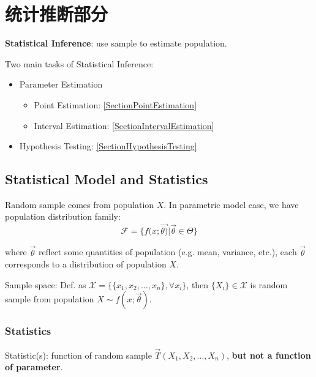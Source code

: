 \section{统计推断部分}

    \textbf{Statistical Inference}: use sample to estimate population.
    
    Two main tasks of Statistical Inference:
    \begin{itemize}[topsep= -5 pt,itemsep= -5 pt,parsep= 0 pt]
        \item Parameter Estimation
        \begin{itemize}
            \item Point Estimation: \hyperref[SectionPointEstimation]{\ref{SectionPointEstimation}}
            \item Interval Estimation: \hyperref[SectionIntervalEstimation]{\ref{SectionIntervalEstimation}}
        \end{itemize}
        \item Hypothesis Testing: \hyperref[SectionHypothesisTesting]{\ref{SectionHypothesisTesting}}
    \end{itemize}

\subsection{Statistical Model and Statistics}\label{SectionStatisticalModelandStatistics}
    Random sample comes from population $X$. In parametric model case, we have population distribution family:
    \[\mathscr{F}=\{f(x;\vec{\theta)}|\vec{\theta}\in\Theta\}\]

    where  $\vec{\theta}$ reflect some quantities of population (e.g. mean, variance, etc.), each $\vec{\theta}$ corresponds to a distribution of population $X$.
    
    Sample space: Def. as $\mathscr{X}=\{\{x_1,x_2,\ldots,x_n\},\forall x_i\}$, then $\{X_i\}\in\mathscr{X}$ is random sample from population $X\sim f(x;\vec{\theta})$.

    
\subsubsection{Statistics}\label{SubSectionStatistics}
    Statistic(s): function of random sample $\vec{T}(X_1,X_2,\ldots,X_n)$, \textbf{but not a function of parameter}.
    
